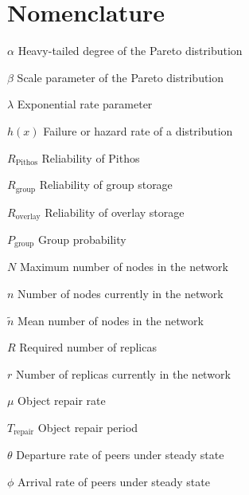 \chapter{Nomenclature}

\newlength{\gnat}

\begin{Nomencl}[\gnat]

        \item[$\alpha$]                 Heavy-tailed degree of the Pareto distribution
        \item[$\beta$]                  Scale parameter of the Pareto distribution
        \item[$\lambda$]                Exponential rate parameter
        \item[$h(x)$]                   Failure or hazard rate of a distribution
        
        \item[$R_{\textrm{Pithos}}$]    Reliability of Pithos
        \item[$R_{\textrm{group}}$]     Reliability of group storage
        \item[$R_{\textrm{overlay}}$]   Reliability of overlay storage
        \item[$P_{\textrm{group}}$]     Group probability
        
		\item[$N$]                      Maximum number of nodes in the network
        \item[$n$]                      Number of nodes currently in the network
        \item[$\tilde{n}$]              Mean number of nodes in the network
        \item[$R$]                      Required number of replicas
        \item[$r$]                      Number of replicas currently in the network
        \item[$\mu$]                    Object repair rate
        \item[$T_{\textrm{repair}}$]    Object repair period
        \item[$\theta$]                 Departure rate of peers under steady state
        \item[$\phi$]                   Arrival rate of peers under steady state
        

\end{Nomencl}
